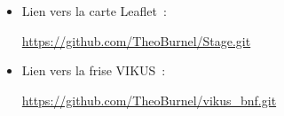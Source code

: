 \begin{itemize}
	\item Lien vers la carte Leaflet~:\par \url{https://github.com/TheoBurnel/Stage.git}\\
	\item Lien vers la frise VIKUS~:\par \url{https://github.com/TheoBurnel/vikus_bnf.git}
\end{itemize}
